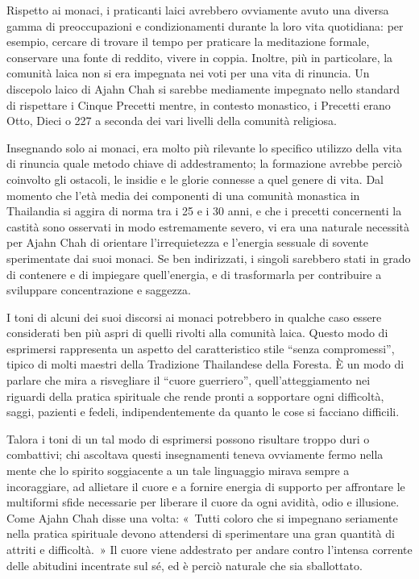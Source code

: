 Rispetto ai monaci, i praticanti laici avrebbero ovviamente avuto una
diversa gamma di preoccupazioni e condizionamenti durante la loro vita
quotidiana: per esempio, cercare di trovare il tempo per praticare la
meditazione formale, conservare una fonte di reddito, vivere in coppia.
Inoltre, più in particolare, la comunità laica non si era impegnata nei
voti per una vita di rinuncia. Un discepolo laico di Ajahn Chah si
sarebbe mediamente impegnato nello standard di rispettare i Cinque
Precetti mentre, in contesto monastico, i Precetti erano Otto, Dieci o
227 a seconda dei vari livelli della comunità religiosa.

Insegnando solo ai monaci, era molto più rilevante lo specifico utilizzo
della vita di rinuncia quale metodo chiave di addestramento; la
formazione avrebbe perciò coinvolto gli ostacoli, le insidie e le glorie
connesse a quel genere di vita. Dal momento che l'età media dei
componenti di una comunità monastica in Thailandia si aggira di norma
tra i 25 e i 30 anni, e che i precetti concernenti la castità sono
osservati in modo estremamente severo, vi era una naturale necessità per
Ajahn Chah di orientare l'irrequietezza e l'energia sessuale di sovente
sperimentate dai suoi monaci. Se ben indirizzati, i singoli sarebbero
stati in grado di contenere e di impiegare quell'energia, e di
trasformarla per contribuire a sviluppare concentrazione e saggezza.

I toni di alcuni dei suoi discorsi ai monaci potrebbero in qualche caso
essere considerati ben più aspri di quelli rivolti alla comunità laica.
Questo modo di esprimersi rappresenta un aspetto del caratteristico
stile ``senza compromessi'', tipico di molti maestri della Tradizione
Thailandese della Foresta. È un modo di parlare che mira a risvegliare
il ``cuore guerriero'', quell'atteggiamento nei riguardi della pratica
spirituale che rende pronti a sopportare ogni difficoltà, saggi,
pazienti e fedeli, indipendentemente da quanto le cose si facciano
difficili.

Talora i toni di un tal modo di esprimersi possono risultare troppo duri
o combattivi; chi ascoltava questi insegnamenti teneva ovviamente fermo
nella mente che lo spirito soggiacente a un tale linguaggio mirava
sempre a incoraggiare, ad allietare il cuore e a fornire energia di
supporto per affrontare le multiformi sfide necessarie per liberare il
cuore da ogni avidità, odio e illusione. Come Ajahn Chah disse una
volta: «~Tutti coloro che si impegnano seriamente nella pratica
spirituale devono attendersi di sperimentare una gran quantità di
attriti e difficoltà.~» Il cuore viene addestrato per andare contro
l'intensa corrente delle abitudini incentrate sul sé, ed è perciò
naturale che sia sballottato.

